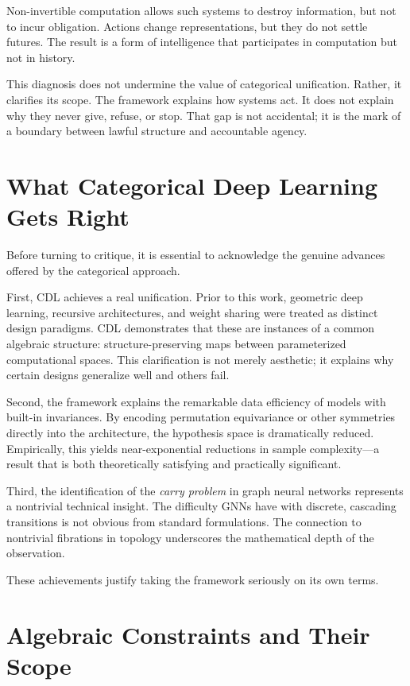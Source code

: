 \documentclass[11pt]{article}
\begin{document}
Non-invertible computation allows such systems to destroy information, but not to
incur obligation. Actions change representations, but they do not settle futures.
The result is a form of intelligence that participates in computation but not in
history.

This diagnosis does not undermine the value of categorical unification. Rather,
it clarifies its scope. The framework explains how systems act. It does not
explain why they never give, refuse, or stop. That gap is not accidental; it is
the mark of a boundary between lawful structure and accountable agency.


\section{What Categorical Deep Learning Gets Right}

Before turning to critique, it is essential to acknowledge the genuine advances
offered by the categorical approach.

First, CDL achieves a real unification. Prior to this work, geometric deep
learning, recursive architectures, and weight sharing were treated as distinct
design paradigms. CDL demonstrates that these are instances of a common algebraic
structure: structure-preserving maps between parameterized computational spaces.
This clarification is not merely aesthetic; it explains why certain designs
generalize well and others fail.

Second, the framework explains the remarkable data efficiency of models with
built-in invariances. By encoding permutation equivariance or other symmetries
directly into the architecture, the hypothesis space is dramatically reduced.
Empirically, this yields near-exponential reductions in sample complexity—a
result that is both theoretically satisfying and practically significant.

Third, the identification of the \emph{carry problem} in graph neural networks
represents a nontrivial technical insight. The difficulty GNNs have with
discrete, cascading transitions is not obvious from standard formulations. The
connection to nontrivial fibrations in topology underscores the mathematical
depth of the observation.

These achievements justify taking the framework seriously on its own terms.

\section{Algebraic Constraints and Their Scope}
\end{document}
